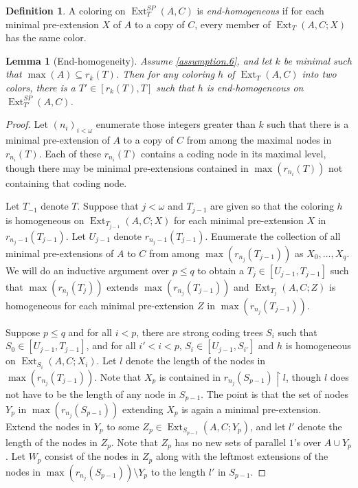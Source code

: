\documentclass{amsart}
\newtheorem{lem}[thm]{Lemma}
\theoremstyle{remark}
\theoremstyle{definition}
\newtheorem{defn}[thm]{Definition}
\theoremstyle{remark}
\newcommand{\om}{\omega}
\newcommand{\sse}{\subseteq}
\DeclareMathOperator{\Ext}{Ext}
\newcommand{\re}{\restriction}
\begin{document}
\begin{defn}\label{defn.endhomog}
A coloring on $\Ext^{SP}_T(A,C)$ is {\em end-homogeneous} if  for each minimal pre-extension $X$ of $A$ to a copy of  $C$,
 every member  of $\Ext_T(A,C;X)$ has the same color.
\end{defn}




\begin{lem}[End-homogeneity]\label{lem.endhomog}
Assume \ref{assumption.6}, and
let $k$ be minimal such that $\max(A)\sse  r_k(T)$.
Then for any coloring $h$
 of $\Ext_T(A,C)$ into  two  colors,
 there is a $T'\in[r_k(T),T]$ such that  $h$ is
 end-homogeneous  on $\Ext_{T'}^{SP}(A,C)$.
\end{lem}



\begin{proof}
Let $(n_i)_{i<\om}$ enumerate those integers greater than $k$ such that there is a minimal pre-extension of $A$ to a copy of  $C$ from among  the maximal nodes in
$r_{n_i}(T)$.
Each  of these  $r_{n_i}(T)$ contains a coding node in its maximal level,
though there may be  minimal pre-extensions  contained in $\max(r_{n_i}(T))$ not containing that coding node.


Let $T_{-1}$ denote $T$.
Suppose that $j<\om$ and $T_{j-1}$ are given  so that
the coloring $h$ is homogeneous on
$\Ext_{T_{j-1}}(A,C;X)$ for each minimal pre-extension $X$ in $r_{n_j-1}(T_{j-1})$.
Let  $U_{j-1}$ denote $r_{n_j-1}(T_{j-1})$.
Enumerate the collection of all minimal pre-extensions of $A$ to $C$ from among  $\max(r_{n_j}(T_{j-1}))$ as $X_0,\dots, X_q$.
We will  do an inductive argument over $p\le q$  to obtain a $T_j\in [U_{j-1},T_{j-1}]$ such that $\max(r_{n_j}(T_j))$ extends $\max(r_{n_j}(T_{j-1}))$
and   $\Ext_{T_j}(A,C;Z)$ is homogeneous
for each minimal pre-extension $Z$ in $\max(r_{n_j}(T_{j-1}))$.



Suppose $p\le q$ and for all $i<p$,
there are strong coding trees $S_i$ such that
 $S_0\in [U_{j-1},T_{j-1}]$,
and
 for all $i'<i<p$,
$S_{i}\in [U_{j-1},S_{i'}]$
and
 $h$ is homogeneous on $\Ext_{S_{i}}(A,C;X_{i})$.
Let $l$ denote the length of the  nodes in $\max(r_{n_j}(T_{j-1}))$.
Note that
$X_p$ is contained in $r_{n_j}(S_{p-1})\re l$,
though $l$ does not have to  be  the length of any node in $S_{p-1}$.
The point is that the set of nodes $Y_p$ in $\max(r_{n_j}(S_{p-1}))$ extending $X_p$
is again a minimal pre-extension.
Extend the nodes in $Y_p$ to some $Z_p\in \Ext_{ S_{p-1}}(A,C;Y_p)$,
and let $l'$ denote the length of the nodes in $Z_p$.
Note that $Z_p$ has no new sets of parallel $1$'s over $A\cup Y_p$.
Let $W_p$ consist of the nodes in $Z_p$ along with the leftmost extensions   of
the nodes in $\max(r_{n_j}(S_{p-1}))\setminus Y_p$
 to the length  $l'$ in $S_{p-1}$.




\end{proof}
\end{document}
